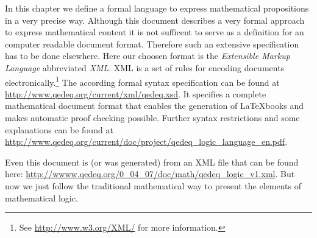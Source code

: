 \documentclass[a4paper,german,10pt,twoside]{book}
\theoremstyle{definition}
\theoremstyle{remark}
\begin{document}
In this chapter we define a formal language to express mathematical propositions in a very precise way. Although this document describes a very formal approach to express mathematical content it is not sufficent to serve as a definition for an computer readable document format. Therefore such an extensive specification has to be done elsewhere. Here our choosen format is the \emph{Extensible Markup Language} abbreviated \emph{XML}. XML is a set of rules for encoding documents electronically.\footnote{See \url{http://www.w3.org/XML/} for more information.}
The according formal syntax specification can be found at \url{http://www.qedeq.org/current/xml/qedeq.xsd}.
It specifies a complete mathematical document format that enables the generation of \LaTeX books and makes automatic proof checking possible. 
Further syntax restrictions and some explanations can be found at \url{http://www.qedeq.org/current/doc/project/qedeq_logic_language_en.pdf}.

\par          
Even this document is (or was generated) from an XML file that can be found here: \url{http://wwww.qedeq.org/0_04_07/doc/math/qedeq_logic_v1.xml}.
But now we just follow the traditional mathematical way to present the elements of mathematical logic.
\end{document}
